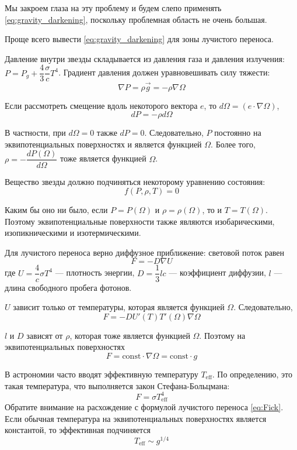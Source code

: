 Мы закроем глаза на эту проблему и будем слепо применять \eqref{eq:gravity_darkening}, поскольку проблемная область не очень большая.


Проще всего вывести \eqref{eq:gravity_darkening} для зоны лучистого переноса.

Давление внутри звезды складывается из давления газа и давления излучения: $P = P_g + \dfrac{4}{3} \dfrac{\sigma}{c} T^4$.
Градиент давления должен уравновешивать силу тяжести:
\[
\nabla P = \rho \vec g = -\rho \nabla \Omega
\]

Если рассмотреть смещение вдоль некоторого вектора $e$, то $d\Omega = (e \cdot \nabla \Omega)$,
\[
dP = -\rho d\Omega
\]

В частности, при $d\Omega = 0$ также $dP = 0$. Следовательно, $P$ постоянно на эквипотенциальных поверхностях и является функцией $\Omega$. Более того, $\rho = -\dfrac{dP(\Omega)}{d\Omega}$ тоже является функцией $\Omega$.

Вещество звезды должно подчиняться некоторому уравнению состояния:
\[
f(P, \rho, T) = 0
\]

Каким бы оно ни было, если $P = P(\Omega)$ и $\rho = \rho(\Omega)$, то и $T = T(\Omega)$. Поэтому эквипотенциальные поверхности также являются изобарическими, изопикническими и изотермическими.

Для лучистого переноса верно диффузное приближение: световой поток равен
\begin{equation}
F = -D \nabla U
\label{eq:Fick}
\end{equation}
где $U = \dfrac{4}{c} \sigma T^4$ --- плотность энергии, $D = \dfrac{1}{3} l c$ --- коэффициент диффузии, $l$ --- длина свободного пробега фотонов.

$U$ зависит только от температуры, которая является функцией $\Omega$. Следовательно,
\[
F = - D U'(T) T'(\Omega) \nabla \Omega
\]

$l$ и $D$ зависят от $\rho$, которая тоже является функцией $\Omega$. Поэтому на эквипотенциальных поверхностях
\[
F = \text{const} \cdot \nabla \Omega = \text{const} \cdot g
\]

В астрономии часто вводят эффективную температуру $T_\text{eff}$. По определению, это такая температура, что выполняется закон Стефана-Больцмана: 
\[
F = \sigma T_\text{eff}^4
\]
Обратите внимание на расхождение с формулой лучистого переноса \eqref{eq:Fick}. Если обычная температура на эквипотенциальных поверхностях является константой, то эффективная подчиняется
\[
T_\text{eff} \sim g^{1/4}
\]

